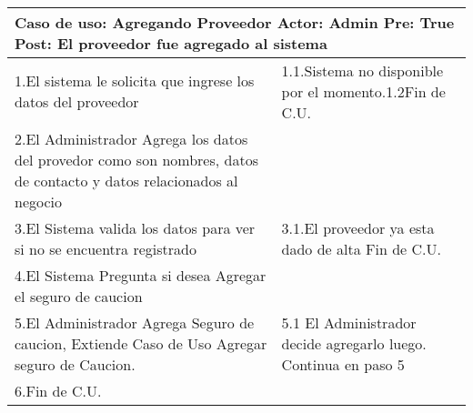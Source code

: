 \newline\\
\begin{tabular}{|p{8cm}|p{8cm}|}
  \hline
  \multicolumn{2}{|p{16cm}|}{
	      \textbf{Caso de uso:} Agregando Proveedor \newline
		  \textbf{Actor:} Admin\newline
		  \textbf{Pre:}  True\newline
		  \textbf{Post:} El proveedor fue agregado al sistema
  }\\
  \hline
		1.El sistema le solicita que ingrese los datos del proveedor & 1.1.Sistema no  disponible por el momento.\newline 1.2Fin de C.U.\\
		\hline
		2.El Administrador Agrega los datos del provedor como son nombres, datos de contacto y datos relacionados al negocio &	\\
		\hline
		3.El Sistema valida los datos para ver si no se encuentra registrado & 3.1.El proveedor ya esta dado de alta \newline 3.2 Fin de C.U.  \\
		\hline
		4.El Sistema Pregunta si desea Agregar el seguro de caucion&\\
		\hline
		5.El Administrador Agrega Seguro de caucion, Extiende Caso de Uso Agregar seguro de Caucion. & 5.1 El Administrador decide agregarlo luego. Continua en paso 5 \\
		\hline
		6.Fin de C.U.& \\
		\hline

  \hline
\end{tabular}
\newline\\
